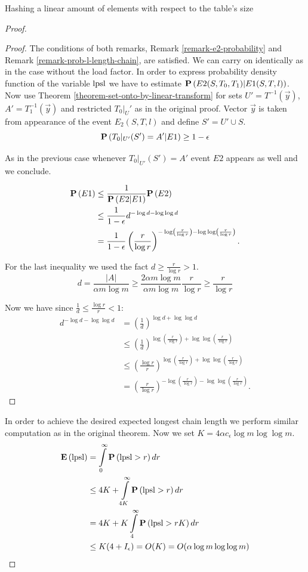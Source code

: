 \begin{section}{Hashing a linear amount of elements with respect to the table's size}
\begin{proof}
\begin{proof}
The conditions of both remarks, Remark \ref{remark-e2-probability} and Remark \ref{remark-prob-l-length-chain}, are satisfied. We can carry on identically as in the case without the load factor. In order to express probability density function of the variable $\mathrm{lpsl}$ we have to estimate $\mathbf{P}\left(E2(S, T_0, T_1)|E1(S, T, l)\right)$. Now use Theorem \ref{theorem-set-onto-by-linear-transform} for sets $U' = T^{-1}(\vec{y})$, $A' = T_1^{-1}(\vec{y})$ and restricted $T_0|_U'$ as in the original proof. Vector $\vec{y}$ is taken from appearance of the event $E_2(S, T, l)$ and define $S' = U' \cup S$.
\[
	\mathbf{P}\left(T_0|_{U'}(S') = A' | E1\right) \geq 1 - \epsilon
\]

As in the previous case whenever $T_0|_{U'}(S') = A'$ event $E2$ appears as well and we conclude.

\[
\begin{split}
\mathbf{P}\left(E1\right) 
	& \leq \frac{1}{\mathbf{P}\left(E2|E1\right)}{\mathbf{P}\left(E2\right)} \\
	& \leq \frac{1}{1 - \epsilon} d ^ {-\log d - \log \log d} \\
	& = \frac{1}{1 - \epsilon} \left(\frac{r}{\log r}\right)^{-\log \left(\frac{r}{\log r}\right) - \log \log \left(\frac{r}{\log r}\right)} \text{.}
\end{split}
\]

For the last inequality we used the fact $d \geq \frac{r}{\log r} > 1$.
\[
	d = \frac{|A|}{\alpha m \log m} \geq \frac{2 \alpha m \log m}{\alpha m \log m} \frac{r}{\log r} \geq \frac{r}{\log r}
\]

Now we have since $\frac{1}{d} \leq \frac{\log r}{r} < 1$:
\[
\begin{split}
d ^ {-\log d - \log \log d} 
	& = \left(\frac{1}{d}\right) ^ {\log d + \log \log d} \\
	& \leq \left(\frac{1}{d}\right) ^ {\log \left(\frac{r}{\log r}\right) + \log \log
 \left(\frac{r}{\log r}\right)} \\
	& \leq \left(\frac{\log r}{r}\right) ^ {\log \left(\frac{r}{\log r}\right) + \log \log
 \left(\frac{r}{\log r}\right)} \\
	& = \left(\frac{r}{\log r}\right)^{-\log \left(\frac{r}{\log r}\right) - \log \log \left(\frac{r}{\log r}\right)} \text{.}
\end{split}
\]
\end{proof}

In order to achieve the desired expected longest chain length we perform similar computation as in the original theorem. Now we set $K = 4 \alpha c_\epsilon \log m \log \log m$.
\[
\begin{split}
\mathbf{E}\left(\mathrm{lpsl}\right)
	& = \int\limits_0^\infty \mathbf{P}\left(\mathrm{lpsl} > r\right) dr \\
	& \leq 4K + \int\limits_{4K}^\infty \mathbf{P}\left(\mathrm{lpsl} > r\right) dr \\
	& = 4K + K\int\limits_4^\infty \mathbf{P}\left(\mathrm{lpsl} > rK\right) dr \\
	& \leq K(4 + I_\epsilon) = O(K) = O(\alpha \log m \log \log m)
\end{split}
\]
\end{proof}
\end{section}
